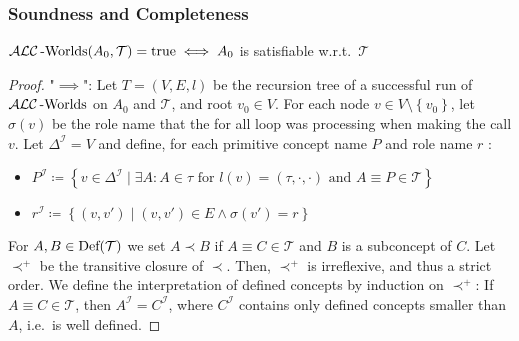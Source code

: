 \subsubsection{Soundness and Completeness}
\medskip
\begin{lemma}\label{lem:5.4}
	$\mathcal{ALC}\operatorname{\text{-Worlds}}(A_0, \mathcal{T}) = \mathit{\text{true}}	\iff A_0$ is satisfiable w.r.t.\ $\mathcal{T}$
\end{lemma}
\begin{proof}
	"$ \implies$":
	Let $T = (V, E, l)$ be the recursion tree of a successful run of $\mathcal{ALC}\operatorname{\text{-Worlds}}$
	on $A_0$ and $\mathcal{T}$, and root $v_0 \in V$.
	For each node $v \in V \setminus \left\{ v_0 \right\}$,
	let $\sigma(v)$ be the role name that the for all loop was processing when making the call $v$.
	Let $\Delta^\mathcal{I} = V$ and define, for each primitive concept name $P$ and role name $r$ :
	\begin{itemize}
		\item $P^{\mathcal{I}} \coloneqq \left\{ v \in \Delta^\mathcal{I} \mid \exists A: A \in \tau \text{ for } l(v) = (\tau, \cdot, \cdot) \text{ and } A \equiv P \in \mathcal{T} \right\}$
		\item $r^\mathcal{I} \coloneqq \left\{ (v,v') \mid (v,v') \in E \land \sigma(v') = r \right\}$
	\end{itemize}
	For $A, B \in \operatorname{\text{Def}}(\mathcal{T})$ we set $A \prec B$ if
	$A \equiv C \in \mathcal{T}$ and $B$ is a subconcept of $C$.
	Let $\prec^+$ be the transitive closure of $\prec$.
	Then, $\prec^+$ is irreflexive, and thus a strict order.
	We define the interpretation of defined concepts by induction on $\prec^+$:
	If  $A \equiv C \in \mathcal{T}$, then $A^\mathcal{I} = C^\mathcal{I}$,
	where $C^\mathcal{I}$ contains only defined concepts smaller than $A$, i.e.\ is well defined.
	

\end{proof}
